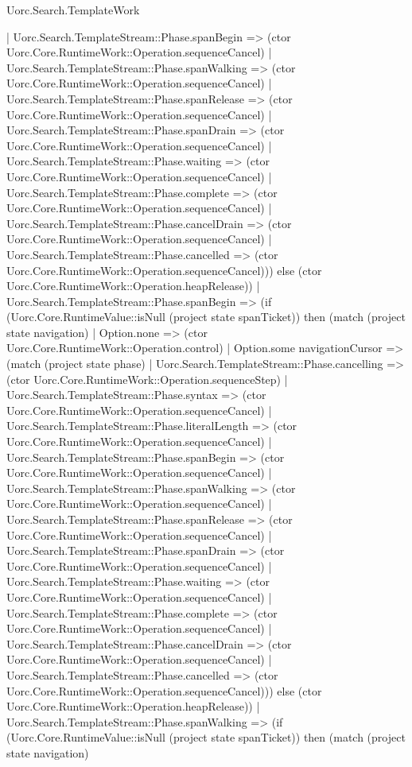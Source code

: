 \begin{lexlean}{Uorc.Search.TemplateWork}
\begin{semanticmodule}
{        | Uorc.Search.TemplateStream::Phase.spanBegin => (ctor Uorc.Core.RuntimeWork::Operation.sequenceCancel)
        | Uorc.Search.TemplateStream::Phase.spanWalking => (ctor Uorc.Core.RuntimeWork::Operation.sequenceCancel)
        | Uorc.Search.TemplateStream::Phase.spanRelease => (ctor Uorc.Core.RuntimeWork::Operation.sequenceCancel)
        | Uorc.Search.TemplateStream::Phase.spanDrain => (ctor Uorc.Core.RuntimeWork::Operation.sequenceCancel)
        | Uorc.Search.TemplateStream::Phase.waiting => (ctor Uorc.Core.RuntimeWork::Operation.sequenceCancel)
        | Uorc.Search.TemplateStream::Phase.complete => (ctor Uorc.Core.RuntimeWork::Operation.sequenceCancel)
        | Uorc.Search.TemplateStream::Phase.cancelDrain => (ctor Uorc.Core.RuntimeWork::Operation.sequenceCancel)
        | Uorc.Search.TemplateStream::Phase.cancelled => (ctor Uorc.Core.RuntimeWork::Operation.sequenceCancel))) else (ctor Uorc.Core.RuntimeWork::Operation.heapRelease))
    | Uorc.Search.TemplateStream::Phase.spanBegin => (if (Uorc.Core.RuntimeValue::isNull (project state spanTicket)) then (match (project state navigation)
      | Option.none => (ctor Uorc.Core.RuntimeWork::Operation.control)
      | Option.some navigationCursor => (match (project state phase)
        | Uorc.Search.TemplateStream::Phase.cancelling => (ctor Uorc.Core.RuntimeWork::Operation.sequenceStep)
        | Uorc.Search.TemplateStream::Phase.syntax => (ctor Uorc.Core.RuntimeWork::Operation.sequenceCancel)
        | Uorc.Search.TemplateStream::Phase.literalLength => (ctor Uorc.Core.RuntimeWork::Operation.sequenceCancel)
        | Uorc.Search.TemplateStream::Phase.spanBegin => (ctor Uorc.Core.RuntimeWork::Operation.sequenceCancel)
        | Uorc.Search.TemplateStream::Phase.spanWalking => (ctor Uorc.Core.RuntimeWork::Operation.sequenceCancel)
        | Uorc.Search.TemplateStream::Phase.spanRelease => (ctor Uorc.Core.RuntimeWork::Operation.sequenceCancel)
        | Uorc.Search.TemplateStream::Phase.spanDrain => (ctor Uorc.Core.RuntimeWork::Operation.sequenceCancel)
        | Uorc.Search.TemplateStream::Phase.waiting => (ctor Uorc.Core.RuntimeWork::Operation.sequenceCancel)
        | Uorc.Search.TemplateStream::Phase.complete => (ctor Uorc.Core.RuntimeWork::Operation.sequenceCancel)
        | Uorc.Search.TemplateStream::Phase.cancelDrain => (ctor Uorc.Core.RuntimeWork::Operation.sequenceCancel)
        | Uorc.Search.TemplateStream::Phase.cancelled => (ctor Uorc.Core.RuntimeWork::Operation.sequenceCancel))) else (ctor Uorc.Core.RuntimeWork::Operation.heapRelease))
    | Uorc.Search.TemplateStream::Phase.spanWalking => (if (Uorc.Core.RuntimeValue::isNull (project state spanTicket)) then (match (project state navigation)
}
\end{semanticmodule}
\end{lexlean}
